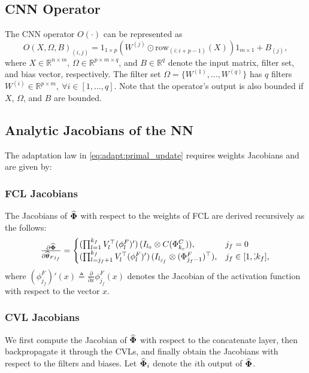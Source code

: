 \documentclass[letterpaper, journal]{IEEEtran}
\newcommand*{\cnnOut}{\Phi^C}
\newcommand*{\fclOut}{\Phi^F}
\newcommand*{\fclAct}{\phi^F}
\newcommand{\tH}{\estwth}
\begin{document}
\appendix
\subsection{CNN Operator} \label{app:cnn-operator}
The CNN operator $O(\cdot)$ can be represented as 
\begin{equation}
    O(X,\Omega,B)_{(i,j)} = 
    1_{1\times p}
    (
    W^{(j)}\odot \text{row}_{(i:i+p-1)} (X)
    )
    1_{m\times 1}
    + B_{(j)}
    ,
\end{equation}
where $X\in\mathbb{R}^{n\times m}$, $\Omega \in\mathbb{R}^{p\times m\times q}$, and $B\in\mathbb{R}^{q}$ denote the input matrix, filter set, and bias vector, respectively.
The filter set $\Omega=\{W^{(1)},\dots,W^{(q)}\}$ has $q$ filters $W^{(i)}\in\mathbb{R}^{p\times m},\ \forall i\in[1,\dots, q]$. 
Note that the operator's output is also bounded if $X$, $\Omega$, and $B$ are bounded.

\subsection{Analytic Jacobians of the NN}
The adaptation law in \eqref{eq:adapt:primal_update} requires weights 
Jacobians and are given by:
\subsubsection{FCL Jacobians}
The Jacobians of $\widehat{\boldsymbol{\Phi}}$ with respect to the weights of FCL are derived recursively as the follows:
{\small
\begin{equation} \label{eq:fcl_jacobians}
  \tfrac{\partial \estNN}{\partial \tH_{F j_f}} 
  = 
  \begin{cases}
    (\prod_{l=1}^{k_f} V_{l}^{\top} (\fclAct_{l})') 
    \,
    (I_{l_0} \otimes C(\cnnOut_{k_c})), 
    & 
    j_f = 0 
    \\
    (\prod_{l=j_f+1}^{k_f} V_{l}^{\top} (\fclAct_{l})') 
    \,
    (I_{l_{j_f}} \otimes (\fclOut_{j_f-1})^{\top}), 
    & 
    j_f \in [1,\dot, k_f]
    ,
  \end{cases}
\end{equation}
}
where
$(\fclAct_{j_f})'(x) \triangleq \tfrac{\partial}{\partial x}\fclAct_{j_f}(x)$
denotes the Jacobian of the activation function with respect to the vector $x$.

\subsubsection{CVL Jacobians}
We first compute the Jacobian of $\widehat{\boldsymbol{\Phi}}$ with respect to the concatenate
layer, then backpropagate it through the CVLs, and finally obtain the
Jacobians with respect to the filters and biases. Let $\widehat{\boldsymbol{\Phi}}_i$ denote the
$i$th output of $\widehat{\boldsymbol{\Phi}}$.
\end{document}
